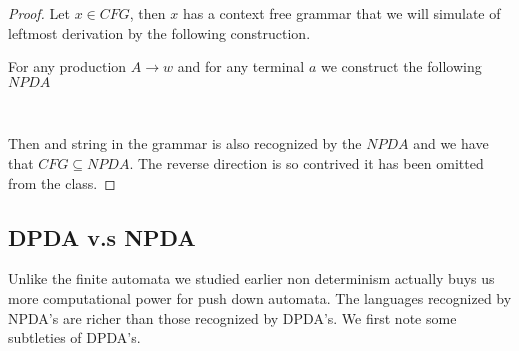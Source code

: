 \documentclass[11pt]{exam}
\begin{document}
\begin{proof}
Let $x \in CFG$, then $x$ has a context free grammar that we will simulate of leftmost derivation by the following construction.

\begin{center}
For any production $A \rightarrow w$ and for any terminal $a$ we construct the following $NPDA$\\
\\
\end{center} 

Then and string in the grammar is also recognized by the $NPDA$ and we have that $CFG \subseteq NPDA$. The reverse direction is so contrived it has been omitted from the class.
\end{proof}


\subsection{DPDA v.s NPDA}

Unlike the finite automata we studied earlier non determinism actually buys us more computational power for push down automata. The languages recognized by NPDA's are richer than those recognized by DPDA's. We first note some subtleties of DPDA's.
\end{document}

